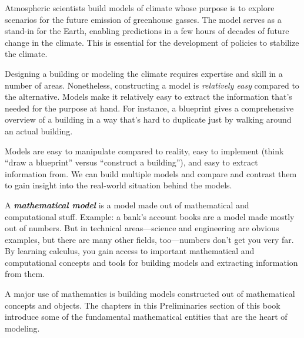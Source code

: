 \documentclass[
  letterpaper,
  DIV=11,
  numbers=noendperiod,
  oneside]{article}
\begin{document}
Atmospheric scientists build models of climate whose purpose is to
explore scenarios for the future emission of greenhouse gasses. The
model serves as a stand-in for the Earth, enabling predictions in a few
hours of decades of future change in the climate. This is essential for
the development of policies to stabilize the climate.


Designing a building or modeling the climate requires expertise and
skill in a number of areas. Nonetheless, constructing a model is
\emph{relatively easy} compared to the alternative. Models make it
relatively easy to extract the information that's needed for the purpose
at hand. For instance, a blueprint gives a comprehensive overview of a
building in a way that's hard to duplicate just by walking around an
actual building.

Models are easy to manipulate compared to reality, easy to implement
(think ``draw a blueprint'' versus ``construct a building''), and easy
to extract information from. We can build multiple models and compare
and contrast them to gain insight into the real-world situation behind
the models.

A \textbf{\emph{mathematical model}} is a model made out of mathematical
and computational stuff. Example: a bank's account books are a model
made mostly out of numbers. But in technical areas---science and
engineering are obvious examples, but there are many other fields,
too---numbers don't get you very far. By learning calculus, you gain
access to important mathematical and computational concepts and tools
for building models and extracting information from them.

A major use of mathematics is building models constructed out of
mathematical concepts and objects. The chapters in this Preliminaries
section of this book introduce some of the fundamental mathematical
entities that are the heart of modeling.
\end{document}
